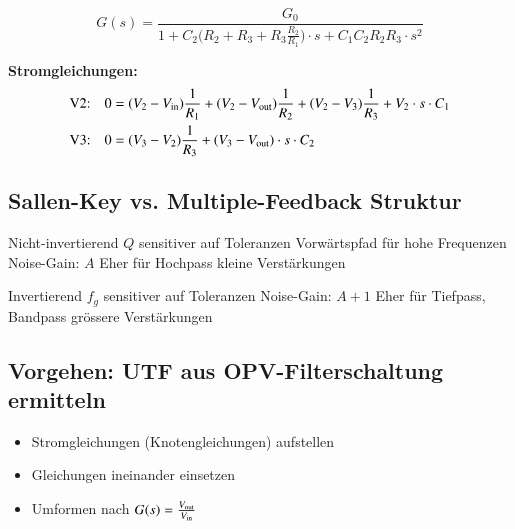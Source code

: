 $$ \boxed{ G(s) = \frac{G_0}{1 + C_2 \Big( R_2 + R_3 + R_3 \frac{R_2}{R_1} \Big) \cdot s + C_1 C_2 R_2 R_3 \cdot s^2 }}$$

\textbf{Stromgleichungen:}
\begin{align*}
    \text{V2:} \quad 0 &= (V_2 - V_{\rm in}) \frac{1}{R_1} + (V_2 - V_{\rm out}) \frac{1}{R_2} + (V_2 - V_3) \frac{1}{R_3} + V_2 \cdot s \cdot C_1  \\
    \text{V3:} \quad 0 &= (V_3 - V_2) \frac{1}{R_3} + (V_3 - V_{\rm out})  \cdot s \cdot C_2 
\end{align*}


\subsection{Sallen-Key vs. Multiple-Feedback Struktur}

\begin{minipage}[t]{0.48\columnwidth}
    \begin{center}
    \end{center}
    \begin{outline}
        \1 Nicht-invertierend
        \1 $Q$ sensitiver auf Toleranzen
        \1 Vorwärtspfad für hohe Frequenzen
        \1 Noise-Gain: $A$
        \1 Eher für 
            \2 Hochpass
            \2 kleine Verstärkungen
    \end{outline}
\end{minipage}
\hfill
\begin{minipage}[t]{0.48\columnwidth}
    \begin{center}
    \end{center}
    \begin{outline}
        \1 Invertierend
        \1 $f_g$ sensitiver auf Toleranzen 
        \1[] 
        \1 Noise-Gain: $A+1$
        \1 Eher für 
            \2 Tiefpass, Bandpass
            \2 grössere Verstärkungen
    \end{outline}
\end{minipage}


\subsection{Vorgehen: UTF aus OPV-Filterschaltung ermitteln}
\begin{itemize}
    \item Stromgleichungen (Knotengleichungen) aufstellen
    \item Gleichungen ineinander einsetzen
    \item Umformen nach $G(s) = \frac{V_{\rm out}}{V_{\rm in}}$
\end{itemize}


